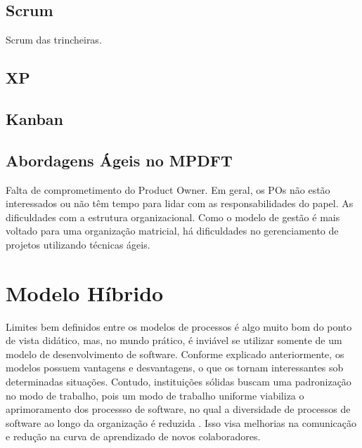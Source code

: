 \documentclass[
	article,			%
	11pt,				%
	oneside,			%
	a4paper,			%
	english,			%
	brazil,				%
	sumario=tradicional
	]{abntex2}
\begin{document}
\subsection{Scrum}

Scrum das trincheiras.

\subsection{XP}

\subsection{Kanban}



\subsection{Abordagens Ágeis no MPDFT}

    Falta de comprometimento do Product Owner. Em geral, os POs não estão
    interessados ou não têm tempo para lidar com as responsabilidades do papel.
    As dificuldades com a estrutura organizacional. Como o modelo de gestão é
    mais voltado para uma organização matricial, há dificuldades no
    gerenciamento de projetos utilizando técnicas ágeis.

\section{Modelo Híbrido}

Limites bem definidos entre os modelos de processos é algo muito bom do ponto de
vista didático, mas, no mundo prático, é inviável se utilizar somente de um
modelo de desenvolvimento de software. Conforme explicado anteriormente, os
modelos possuem vantagens e desvantagens, o que os tornam interessantes sob
determinadas situações. Contudo, instituições sólidas buscam uma padronização no
modo de trabalho, pois um modo de trabalho uniforme viabiliza o aprimoramento
dos processso de software, no qual a diversidade de processos de software ao
longo da organização é reduzida \cite{sommerville2007}. Isso visa melhorias na
comunicação e redução na curva de aprendizado de novos colaboradores.
\end{document}
